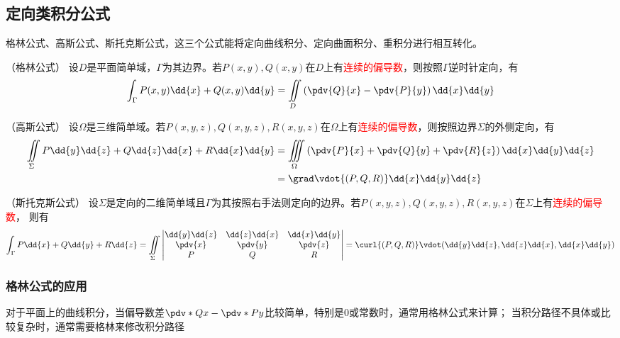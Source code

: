 \subsection{定向类积分公式}
格林公式、高斯公式、斯托克斯公式，这三个公式能将定向曲线积分、定向曲面积分、重积分进行相互转化。
\begin{theorem}
    （格林公式）
    \label{th:格林公式}
    设$D$是平面简单域，$\Gamma$为其边界。若$P(x,y),Q(x,y)$在$D$上有\textcolor{red}{连续的偏导数}，则按照$\Gamma$逆时针定向，有
    \[ \int_\Gamma P(x,y)\dd{x} + Q(x,y)\dd{y} = \iint\limits_D \left(\pdv{Q}{x} - \pdv{P}{y}\right) \dd{x}\dd{y} \]
\end{theorem}
\begin{theorem}
    （高斯公式）
    \label{th:高斯公式}
    设$\Omega$是三维简单域。若$P(x,y,z),Q(x,y,z),R(x,y,z)$在$\Omega$上有\textcolor{red}{连续的偏导数}，则按照边界$\Sigma$的外侧定向，有
    \begin{align*}
        \iint\limits_\Sigma P\dd{y}\dd{z} + Q\dd{z}\dd{x} + R\dd{x}\dd{y}
         & =\iiint\limits_\Omega \left(\pdv{P}{x} + \pdv{Q}{y} + \pdv{R}{z}\right) \dd{x}\dd{y}\dd{z} \\
         & =\grad\vdot{(P,Q,R)}\dd{x}\dd{y}\dd{z}
    \end{align*}
\end{theorem}
\begin{theorem}
    （斯托克斯公式）
    设$\Sigma$是定向的二维简单域且$\Gamma$为其按照右手法则定向的边界。若$P(x,y,z),Q(x,y,z),R(x,y,z)$在$\Sigma$上有\textcolor{red}{连续的偏导数}，
    则有
    \[
        \int_\Gamma P\dd{x} + Q\dd{y} + R\dd{z}
        =
        \iint\limits_\Sigma
        \begin{vmatrix}
            \dd{y}\dd{z} & \dd{z}\dd{x} & \dd{x}\dd{y} \\
            \pdv{x}      & \pdv{y}      & \pdv{z}      \\
            P            & Q            & R
        \end{vmatrix}
        =\curl{(P,Q,R)}\vdot(\dd{y}\dd{z},\dd{z}\dd{x},\dd{x}\dd{y})
    \]
\end{theorem}

\subsubsection{格林公式的应用}
对于平面上的曲线积分，当偏导数差$\pdv*{Q}{x}-\pdv*{P}{y}$比较简单，特别是$0$或常数时，通常用格林公式来计算；
当积分路径不具体或比较复杂时，通常需要格林来修改积分路径

